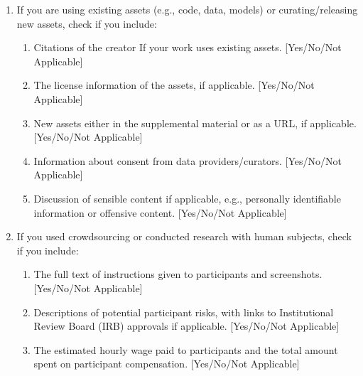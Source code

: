 \documentclass[twoside]{article}
\theoremstyle{plain}
\theoremstyle{definition}
\theoremstyle{remark}
\newtheorem{proof sketch}[theorem]{Proof Sketch}
\begin{document}
\begin{enumerate}
  \item If you are using existing assets (e.g., code, data, models) or curating/releasing new assets, check if you include:
  \begin{enumerate}
    \item Citations of the creator If your work uses existing assets. [Yes/No/Not Applicable]
    \item The license information of the assets, if applicable. [Yes/No/Not Applicable]
    \item New assets either in the supplemental material or as a URL, if applicable. [Yes/No/Not Applicable]
    \item Information about consent from data providers/curators. [Yes/No/Not Applicable]
    \item Discussion of sensible content if applicable, e.g., personally identifiable information or offensive content. [Yes/No/Not Applicable]
  \end{enumerate}

  \item If you used crowdsourcing or conducted research with human subjects, check if you include:
  \begin{enumerate}
    \item The full text of instructions given to participants and screenshots. [Yes/No/Not Applicable]
    \item Descriptions of potential participant risks, with links to Institutional Review Board (IRB) approvals if applicable. [Yes/No/Not Applicable]
    \item The estimated hourly wage paid to participants and the total amount spent on participant compensation. [Yes/No/Not Applicable]
  \end{enumerate}

\end{enumerate}


\newpage
\onecolumn
{}
\newpage
\appendix
\end{document}
